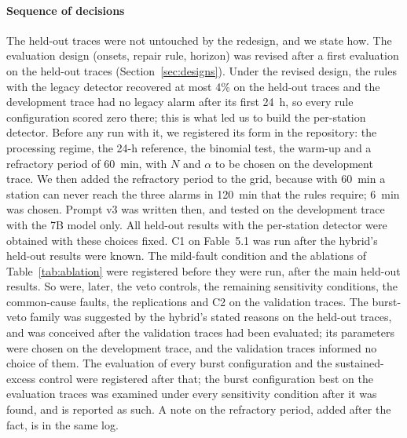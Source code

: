 \documentclass[preprint,11pt]{elsarticle}
\begin{document}
\paragraph{Sequence of decisions}
The held-out traces were not untouched by the redesign, and we state how. The evaluation design (onsets, repair rule, horizon) was revised after a first evaluation on the held-out traces (Section~\ref{sec:designs}). Under the revised design, the rules with the legacy detector recovered at most 4\% on the held-out traces and the development trace had no legacy alarm after its first 24~h, so every rule configuration scored zero there; this is what led us to build the per-station detector. Before any run with it, we registered its form in the repository: the processing regime, the 24-h reference, the binomial test, the warm-up and a refractory period of 60~min, with $N$ and $\alpha$ to be chosen on the development trace. We then added the refractory period to the grid, because with 60~min a station can never reach the three alarms in 120~min that the rules require; 6~min was chosen. Prompt v3 was written then, and tested on the development trace with the 7B model only. All held-out results with the per-station detector were obtained with these choices fixed. C1 on Fable~5.1 was run after the hybrid's held-out results were known. The mild-fault condition and the ablations of Table~\ref{tab:ablation} were registered before they were run, after the main held-out results. So were, later, the veto controls, the remaining sensitivity conditions, the common-cause faults, the replications and C2 on the validation traces. The burst-veto family was suggested by the hybrid's stated reasons on the held-out traces, and was conceived after the validation traces had been evaluated; its parameters were chosen on the development trace, and the validation traces informed no choice of them. The evaluation of every burst configuration and the sustained-excess control were registered after that; the burst configuration best on the evaluation traces was examined under every sensitivity condition after it was found, and is reported as such. A note on the refractory period, added after the fact, is in the same log.
\end{document}
